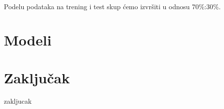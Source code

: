 \documentclass[a4paper]{article}
\begin{document}
Podelu podataka na trening i test skup ćemo izvršiti u odnosu 70\%:30\%.\\




\section{Modeli}
\label{sec:modeli}




\pagebreak

\section{Zaključak}
\label{sec:zakljucak}
zakljucak


\pagebreak

\appendix


\appendix
\end{document}
